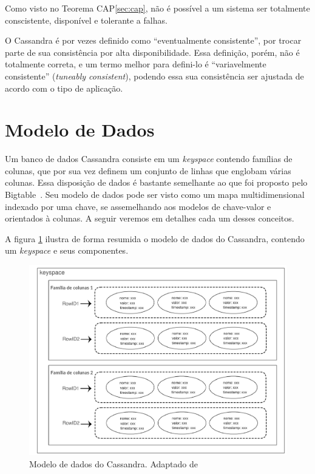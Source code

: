 Como visto no Teorema CAP\ref{sec:cap}, não é possível a um sistema ser totalmente conscistente, disponível e tolerante a falhas. 

O Cassandra é por vezes definido como \enquote{eventualmente consistente}, por trocar parte de sua consistência por alta disponibilidade. Essa definição, porém, não é totalmente correta, e um termo melhor para defini-lo é \enquote{variavelmente consistente} (\emph{tuneably consistent}), podendo essa sua consistência ser ajustada de acordo com o tipo de aplicação.

\section{Modelo de Dados}

Um banco de dados Cassandra consiste em um \emph{keyspace} contendo famílias de colunas, que por sua vez definem um conjunto de linhas que englobam várias colunas. Essa disposição de dados é bastante semelhante ao que foi proposto pelo Bigtable~\cite{lakshmancassandra, bigtable}. Seu modelo de dados pode ser visto como um mapa multidimensional indexado por uma chave, se assemelhando aos modelos de chave-valor e orientados à colunas. A seguir veremos em detalhes cada um desses conceitos.

A figura \ref{fig:cassandradm} ilustra de forma resumida o modelo de dados do Cassandra, contendo um \emph{keyspace} e seus componentes. 

\begin{figure}[!htb]
\centering
\includegraphics[width=1.1\textwidth]{figuras/cassandradatamodel.png}
\caption{Modelo de dados do Cassandra. Adaptado de ~\cite{ibmcassandra}}
\label{fig:cassandradm}
\end{figure}


